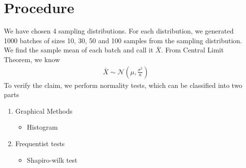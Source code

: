 \documentclass{article}
\begin{document}
\section{Procedure}
We have chosen 4 sampling distributions. For each distribution, we generated 1000 batches of sizes 10, 30, 50 and 100 samples from the sampling distribution. We find the sample mean of each batch and call it $\bar{X}$. From Central Limit Theorem, we know
\begin{align}
    \bar{X} \sim \mathcal{N}\left(\mu, \frac{\sigma^2}{n}\right)
\end{align}
To verify the claim, we perform normality tests, which can be classified into two parts
\begin{enumerate}
    \item Graphical Methods
    \begin{itemize}
        \item Histogram
    \end{itemize}
    \item{Frequentist tests}
    \begin{itemize}
        \item Shapiro-wilk test
    \end{itemize}
\end{enumerate}
\end{document}
